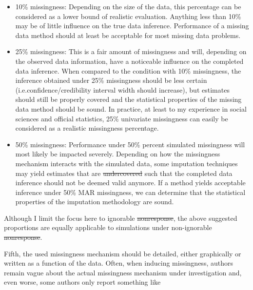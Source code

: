 \documentclass[ %
]{article} %
\providecommand{\tightlist}{%
  \setlength{\itemsep}{0pt}\setlength{\parskip}{0pt}} %
\providecommand{\DIFaddtex}[1]{{\protect\color{blue}\uwave{#1}}} %
\providecommand{\DIFdeltex}[1]{{\protect\color{red}\sout{#1}}}                      %
\providecommand{\DIFaddbegin}{} %
\providecommand{\DIFaddend}{} %
\providecommand{\DIFdelbegin}{} %
\providecommand{\DIFdelend}{} %
\providecommand{\DIFadd}[1]{\texorpdfstring{\DIFaddtex{#1}}{#1}} %
\providecommand{\DIFdel}[1]{\texorpdfstring{\DIFdeltex{#1}}{}} %
\newcommand{\DIFscaledelfig}{0.5}
\newlength{\DIFdelgraphicswidth} %
\newlength{\DIFdelgraphicsheight} %
\newcommand{\DIFaddincludegraphics}[2][]{{\color{blue}\fbox{\DIFOincludegraphics[#1]{#2}}}} %
\newcommand{\DIFdelincludegraphics}[2][]{%
\sbox{\DIFdelgraphicsbox}{\DIFOincludegraphics[#1]{#2}}%
\settoboxwidth{\DIFdelgraphicswidth}{\DIFdelgraphicsbox} %
\settoboxtotalheight{\DIFdelgraphicsheight}{\DIFdelgraphicsbox} %
\scalebox{\DIFscaledelfig}{%
\parbox[b]{\DIFdelgraphicswidth}{\usebox{\DIFdelgraphicsbox}\\[-\baselineskip] \rule{\DIFdelgraphicswidth}{0em}}\llap{\resizebox{\DIFdelgraphicswidth}{\DIFdelgraphicsheight}{%
\setlength{\unitlength}{\DIFdelgraphicswidth}%
\begin{picture}(1,1)%
\thicklines\linethickness{2pt} %
{\color[rgb]{1,0,0}\put(0,0){\framebox(1,1){}}}%
{\color[rgb]{1,0,0}\put(0,0){\line( 1,1){1}}}%
{\color[rgb]{1,0,0}\put(0,1){\line(1,-1){1}}}%
\end{picture}%
}\hspace*{3pt}}} %
} %
\DeclareRobustCommand{\DIFaddbegin}{\DIFOaddbegin \let\includegraphics\DIFaddincludegraphics} %
\DeclareRobustCommand{\DIFaddend}{\DIFOaddend \let\includegraphics\DIFOincludegraphics} %
\DeclareRobustCommand{\DIFdelbegin}{\DIFOdelbegin \let\includegraphics\DIFdelincludegraphics} %
\DeclareRobustCommand{\DIFdelend}{\DIFOaddend \let\includegraphics\DIFOincludegraphics} %
\begin{document}
\begin{itemize}
\DIFaddbegin \tightlist
\DIFaddend \item
  10\% missingness: Depending on the size of the data, this percentage
  can be considered as a lower bound of realistic evaluation. Anything
  less than 10\% may be of little influence on the true data inference.
  Performance of a missing data method should at least be acceptable for
  most missing data problems.
\item
  25\% missingness: This is a fair amount of missingness and will,
  depending on the observed data information, have a noticeable
  influence on the completed data inference. When compared to the
  condition with 10\% missingness, the inference obtained under 25\%
  missingness should be less certain (i.e.\DIFaddbegin \DIFadd{~}\DIFaddend confidence/credibility
  interval width should increase), but estimates should still be
  properly covered and the statistical properties of the missing data
  method should be sound. In practice, at least to my experience in
  social sciences and official statistics, 25\% univariate missingness
  can easily be considered as a realistic missingness percentage.
\item
  50\% missingness: Performance under 50\% percent simulated missingness
  will most likely be impacted severely. Depending on how the
  missingness mechanism interacts with the simulated data, some
  imputation techniques may yield estimates that are \DIFdelbegin \DIFdel{undercovered }\DIFdelend \DIFaddbegin \DIFadd{under-covered }\DIFaddend such
  that the completed data inference should not be deemed valid anymore.
  If a method yields acceptable inference under 50\% MAR missingness, we
  can determine that the statistical properties of the imputation
  methodology are sound.
\end{itemize}
\DIFaddbegin 

\DIFaddend Although I limit the focus here to ignorable \DIFdelbegin \DIFdel{nonresponse}\DIFdelend \DIFaddbegin \DIFadd{non-response}\DIFaddend , the above
suggested proportions are equally applicable to simulations under
non-ignorable \DIFdelbegin \DIFdel{nonresponse}\DIFdelend \DIFaddbegin \DIFadd{non-response}\DIFaddend .

Fifth, the used missingness mechanism should be detailed, either
graphically or written as a function of the data. Often, when inducing
missingness, authors remain vague about the actual missingness mechanism
under investigation and, even worse, some authors only report something
like
\DIFaddbegin 
\end{document}
